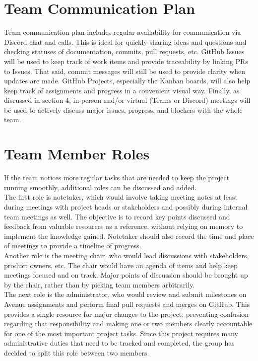 \documentclass{article}
\begin{document}
\section{Team Communication Plan}

Team communication plan includes regular availability for communication via Discord chat and calls. This is ideal for quickly sharing ideas and questions and checking statuses of documentation, commits, pull requests, etc. GitHub Issues will be used to keep track of work items and provide traceability by linking PRs to Issues. That said, commit messages will still be used to provide clarity when updates are made. GitHub Projects, especially the Kanban boards, will also help keep track of assignments and progress in a convenient visual way. Finally, as discussed in section 4, in-person and/or virtual (Teams or Discord) meetings will be used to actively discuss major issues, progress, and blockers with the whole team.

\section{Team Member Roles}
If the team notices more regular tasks that are needed to keep the project running smoothly, additional roles can be discussed and added.\\

The first role is notetaker, which would involve taking meeting notes at least during meetings with project heads or stakeholders and possibly during internal team meetings as well. The objective is to record key points discussed and feedback from valuable resources as a reference, without relying on memory to implement the knowledge gained. Notetaker should also record the time and place of meetings to provide a timeline of progress.\\

Another role is the meeting chair, who would lead discussions with stakeholders, product owners, etc. The chair would have an agenda of items and help keep meetings focused and on track. Major points of discussion should be brought up by the chair, rather than by picking team members arbitrarily.\\

The next role is the administrator, who would review and submit milestones on Avenue assignments and perform final pull requests and merges on GitHub. This provides a single resource for major changes to the project, preventing confusion regarding that responsibility and making one or two members clearly accountable for one of the most important project tasks. Since this project requires many administrative duties that need to be tracked and completed, the group has decided to split this role between two members.\\
\end{document}
